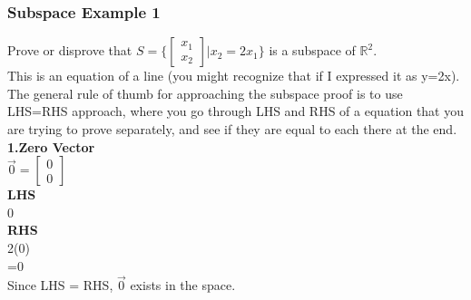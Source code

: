 \documentclass[12pt]{article}
\newcommand{\R}{\mathbb{R}}
\begin{document}
\subsubsection{Subspace Example 1}
Prove or disprove that $S=\{\begin{bmatrix}x_1\\x_2\end{bmatrix} | x_2 = 2x_1\}$ is a subspace of $\R^2$.\\
This is an equation of a line (you might recognize that if I expressed it as y=2x).\\
The general rule of thumb for approaching the subspace proof is to use LHS=RHS approach, where you go through LHS and RHS of a equation that you are trying to prove separately, and see if they are equal to each there at the end.\\
\textbf{1.Zero Vector}\\
$\vec{0} = \begin{bmatrix}0\\0\end{bmatrix}$\\
\textbf{LHS}\\
0\\
\textbf{RHS}\\
2(0)\\
=0\\
Since LHS = RHS, $\vec{0}$ exists in the space.\\
\end{document}

